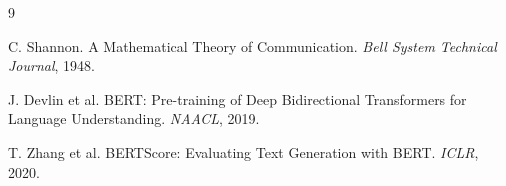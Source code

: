 \documentclass{article}
\theoremstyle{definition}
\begin{document}
\begin{thebibliography}{9}

C. Shannon.
\newblock A Mathematical Theory of Communication.
\newblock \emph{Bell System Technical Journal}, 1948.

J. Devlin et al.
\newblock BERT: Pre-training of Deep Bidirectional Transformers for Language Understanding.
\newblock \emph{NAACL}, 2019.

T. Zhang et al.
\newblock BERTScore: Evaluating Text Generation with BERT.
\newblock \emph{ICLR}, 2020.

\end{thebibliography}
\end{document}
